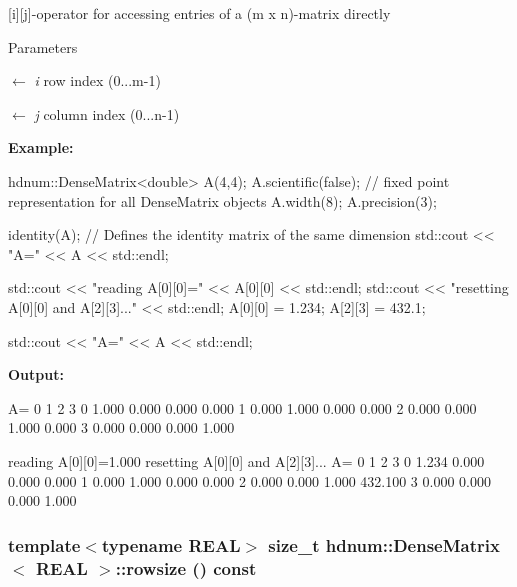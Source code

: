 \mbox{[}i\mbox{]}\mbox{[}j\mbox{]}-\/operator for accessing entries of a (m x n)-\/matrix directly 


\begin{DoxyParams}{Parameters}
\item[\mbox{$\leftarrow$} {\em i}]row index (0...m-\/1) \item[\mbox{$\leftarrow$} {\em j}]column index (0...n-\/1)\end{DoxyParams}
{\bfseries Example:} 
\begin{DoxyCode}
  hdnum::DenseMatrix<double> A(4,4);
  A.scientific(false); // fixed point representation for all DenseMatrix objects
  A.width(8);
  A.precision(3);

  identity(A);  // Defines the identity matrix of the same dimension
  std::cout << "A=" << A << std::endl;

  std::cout << "reading A[0][0]=" << A[0][0] << std::endl;
  std::cout << "resetting A[0][0] and A[2][3]..." << std::endl;
  A[0][0] = 1.234;
  A[2][3] = 432.1;

  std::cout << "A=" << A << std::endl;
\end{DoxyCode}


{\bfseries Output:} \begin{DoxyVerb}
A=
                    0        1        2        3 
          0     1.000    0.000    0.000    0.000 
          1     0.000    1.000    0.000    0.000 
          2     0.000    0.000    1.000    0.000 
          3     0.000    0.000    0.000    1.000 

reading A[0][0]=1.000
resetting A[0][0] and A[2][3]...
A=
                    0        1        2        3 
          0     1.234    0.000    0.000    0.000 
          1     0.000    1.000    0.000    0.000 
          2     0.000    0.000    1.000  432.100 
          3     0.000    0.000    0.000    1.000 
	  \end{DoxyVerb}
 \hypertarget{classhdnum_1_1DenseMatrix_aa5cc4ed9e7ccaafa1d9396ded5e7189b}{
\subsubsection[{rowsize}]{\setlength{\rightskip}{0pt plus 5cm}template$<$typename REAL$>$ size\_\-t {\bf hdnum::DenseMatrix}$<$ REAL $>$::rowsize () const}}
\label{classhdnum_1_1DenseMatrix_aa5cc4ed9e7ccaafa1d9396ded5e7189b}


